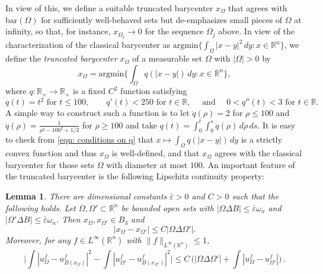 \documentclass[10pt,a4paper]{amsart}
\numberwithin{equation}{section}
\newtheorem{lemma}[theorem]{Lemma}
\def\R{{\mathbb R}}
\def\e{\varepsilon}
\def\w{\omega}
\def\W{\Omega}
\def\baryEps{\bar{\e}}
\def\TBF{q}
\begin{document}
In view of this, we define a suitable {truncated barycenter} $x_\W$ that agrees with $\text{bar}(\W)$ for sufficiently well-behaved sets but de-emphasizes small pieces of $\W$ at infinity, so that, for instance, $x_{\Omega_j} \to 0$ for the sequence $\W_{j}$ above. In view of the characterization  of the classical barycenter as $ \text{argmin}\{ \int_\Omega |x-y|^2 \,dy : x \in \R^n\}$, we define the {\it truncated barycenter} $x_\W$ of a measurable set $\W$ with $|\W|>0$ by 
\begin{equation}
	\label{eqn: barycenter definition}
x_\W = \text{argmin}\Big\{ \int_\W \TBF(|x-y|)\,dy : x \in\R^n \Big\},
\end{equation}
where  $\TBF: \R_+\to \R_+$ is a fixed $C^2$ function satisfying 
\begin{equation}
    \label{eqn: conditions on q}
\TBF(t) = t^2\text{ for }t\leq 100, 
\qquad \TBF'(t)<250 \text{ for }t\in \R, \quad \text{ and } \quad  0 < \TBF'' (t)<3 \text{ for }t\in \R.
\end{equation}
A simple way to construct such a function is to let $\ddot{q}(\rho)=2$ for $\rho\leq 100$ and $\ddot{q}(\rho) =\tfrac{1}{\rho^2 -100^2+1/2}$ for $\rho \geq 100$ and take $q(t) = \int_0^t\int_0^s \ddot{q}(\rho)\,d\rho\,ds$.  
It is easy to check from \eqref{eqn: conditions on q} that $x\mapsto \int_\W \TBF(|x-y|)\,dy$ is a strictly convex function and thus $x_\W$ is well-defined, and that $x_\W$ agrees with the classical barycenter for those sets $\W$ with diameter at most $100$.
An important feature of the truncated barycenter is the following Lipschitz continuity property:
 \begin{lemma}\label{lem: lip bary}
  There are dimensional constants $\baryEps >0$ and $C>0$ such that the following holds. Let $\W, \W'\subset \R^n$ be bounded open sets with $|\W \Delta B| \leq \baryEps \omega_n$ and $|\W' \Delta B| \leq \baryEps \w_n$.  Then $x_\W, x_{\W'} \in B_3$ and  
  \begin{equation}
      \label{eqn: bary lip}
  |x_\W -x_{\W'}|\leq C |\W\Delta \W'|.
   \end{equation}
  Moreover, for any $f \in L^\infty(\R^n)$  with $\|f\|_{L^\infty(\R^n)} \leq1$,
\begin{equation}\label{eqn: beta lip}
\Big| \int   |u_\W^f - u_{B(x_\W)}^f|^2 -  \int  |u_{\W'}^f-u_{B(x_{\W'})}^f|^2   \Big| \leq C\,\Big( |\W\Delta \W'| +\int |u_{\W}^f - u_{\W'}^f|\Big)\,. 
\end{equation}

\end{lemma}
\end{document}
